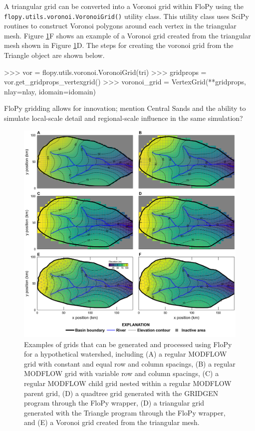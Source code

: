 \documentclass[11pt, oneside]{article}   	%
\begin{document}
A triangular grid can be converted into a Voronoi grid within FloPy using the \texttt{flopy.utils.voronoi.VoronoiGrid()} utility class.  This utility class uses SciPy routines  \citep{2020SciPy-NMeth} to construct Voronoi polygons around each vertex in the triangular mesh.  Figure \ref{fig:grids}F shows an example of a Voronoi grid created from the triangular mesh shown in Figure \ref{fig:grids}D.  The steps for creating the voronoi grid from the Triangle object are shown below.

\begin{python}
>>> vor = flopy.utils.voronoi.VoronoiGrid(tri)
>>> gridprops = vor.get_gridprops_vertexgrid()
>>> voronoi_grid = VertexGrid(**gridprops, nlay=nlay, idomain=idomain)
\end{python}

FloPy gridding allows for innovation; mention Central Sands and the ability to simulate local-scale detail and regional-scale influence in the same simulation?

\begin{figure}[ht!]
	\begin{center}
		\includegraphics{figures/grids_geoprocessing.png}
	\end{center}
	\caption{Examples of grids that can be generated and processed using FloPy for a hypothetical watershed, including (A) a regular MODFLOW grid with constant and equal row and column spacings, (B) a regular MODFLOW grid with variable row and column spacings, (C) a regular MODFLOW child grid nested within a regular MODFLOW parent grid, (D) a quadtree grid generated with the GRIDGEN program \citep{gridgen} through the FloPy wrapper, (D) a triangular grid generated with the Triangle program \citep{trianglemesh} through the FloPy wrapper, and (E) a Voronoi grid created from the triangular mesh.}\label{fig:grids}
\end{figure}
\end{document}
